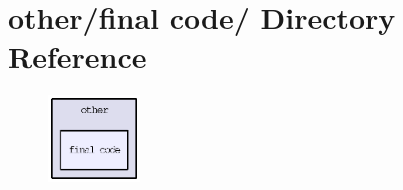 \section{other/final code/ Directory Reference}
\label{dir_76bc75ba7a0918649c0ffb8d087e20ae}


\begin{figure}[H]
\begin{center}
\leavevmode
\includegraphics[width=69pt]{dir_76bc75ba7a0918649c0ffb8d087e20ae_dep}
\end{center}
\end{figure}
